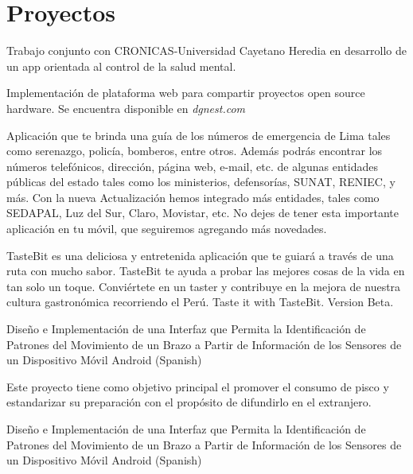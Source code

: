 \section{Proyectos}

{Trabajo conjunto con CRONICAS-Universidad Cayetano Heredia en desarrollo de un app orientada al control de la salud mental.}  

{Implementación de plataforma web para compartir proyectos open source hardware. Se encuentra disponible en \emph{dgnest.com}}  

{Aplicación que te brinda una guía de los números de emergencia de Lima tales como serenazgo, policía, bomberos, entre otros.
Además podrás encontrar los números telefónicos, dirección, página web, e-mail, etc. de algunas entidades públicas del estado tales como los ministerios, defensorías, SUNAT, RENIEC, y más.
Con la nueva Actualización hemos integrado más entidades, tales como SEDAPAL, Luz del Sur, Claro, Movistar, etc.
No dejes de tener esta importante aplicación en tu móvil, que seguiremos agregando más novedades.}  

{TasteBit es una deliciosa y entretenida aplicación que te guiará a través de una ruta con mucho sabor. 
TasteBit te ayuda  a probar las mejores cosas de la vida en tan solo un toque. 
Conviértete en un taster y contribuye en la mejora de nuestra cultura gastronómica recorriendo el Perú.
Taste it with TasteBit.
Version Beta.}  

{Diseño e Implementación de una Interfaz que Permita la Identificación de Patrones del Movimiento de un Brazo a Partir de Información de los Sensores de un Dispositivo Móvil Android (Spanish)}  

{Este proyecto tiene como objetivo principal el promover el consumo de pisco y estandarizar su preparación con el propósito de difundirlo en el extranjero.}  

{Diseño e Implementación de una Interfaz que Permita la Identificación de Patrones del Movimiento de un Brazo a Partir de Información de los Sensores de un Dispositivo Móvil Android (Spanish)}  